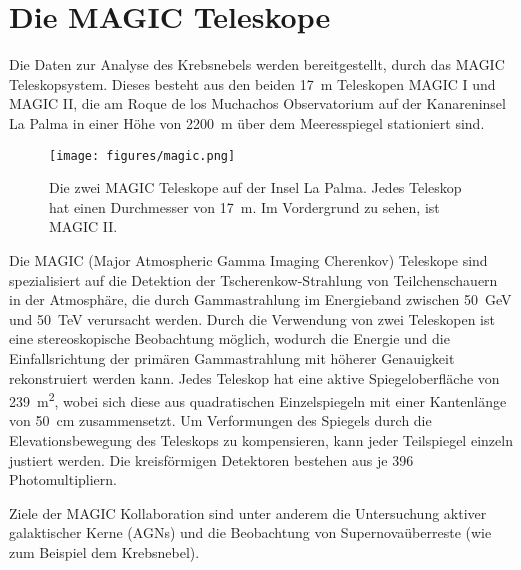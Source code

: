 \section{Die MAGIC Teleskope}
\label{sec:teleskop}

Die Daten zur Analyse des Krebsnebels werden bereitgestellt, durch das MAGIC
Teleskopsystem. Dieses besteht aus den beiden \SI{17}{\metre} Teleskopen MAGIC I
und MAGIC II, die am Roque de los Muchachos Observatorium auf der Kanareninsel
La Palma in einer Höhe von \SI{2200}{\metre} über dem Meeresspiegel stationiert
sind.

\begin{figure}
  \centering
  \texttt{[image: figures/magic.png]}
  \caption{Die zwei MAGIC Teleskope auf der Insel La Palma. Jedes Teleskop hat
  einen Durchmesser von \SI{17}{\metre}. Im Vordergrund zu sehen, ist MAGIC II.}
  \label{fig:telescope}
\end{figure}

Die MAGIC (Major Atmospheric Gamma Imaging Cherenkov) Teleskope sind
spezialisiert auf die Detektion der Tscherenkow-Strahlung von Teilchenschauern
in der Atmosphäre, die durch Gammastrahlung im Energieband zwischen
\SI{50}{\giga\electronvolt} und \SI{50}{\tera\electronvolt} verursacht werden.
Durch die Verwendung von zwei Teleskopen ist eine stereoskopische Beobachtung
möglich, wodurch die Energie und die Einfallsrichtung der primären
Gammastrahlung mit höherer Genauigkeit rekonstruiert werden kann. Jedes Teleskop
hat eine aktive Spiegeloberfläche von \SI{239}{\metre\squared}, wobei sich diese
aus quadratischen Einzelspiegeln mit einer Kantenlänge von \SI{50}{\centi\metre}
zusammensetzt. Um Verformungen des Spiegels durch die Elevationsbewegung des
Teleskops zu kompensieren, kann jeder Teilspiegel einzeln justiert werden. Die
kreisförmigen Detektoren bestehen aus je 396 Photomultipliern.

Ziele der MAGIC Kollaboration sind unter anderem die Untersuchung aktiver
galaktischer Kerne (AGNs) und die Beobachtung von Supernovaüberreste (wie zum
Beispiel dem Krebsnebel).
